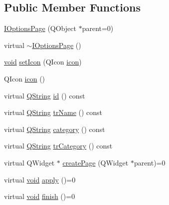 \subsection*{Public Member Functions}
\begin{DoxyCompactItemize}
\item 
\hyperlink{group___core_plugin_ga9b695b2de67229131dbe91bd1ef22ef8}{I\-Options\-Page} (Q\-Object $\ast$parent=0)
\item 
virtual \hyperlink{group___core_plugin_gaaea80acd4f4df67edf6a8027abf6b016}{$\sim$\-I\-Options\-Page} ()
\item 
\hyperlink{group___u_a_v_objects_plugin_ga444cf2ff3f0ecbe028adce838d373f5c}{void} \hyperlink{group___core_plugin_gaab16eddf8ad1ee26863b41acaf18feb3}{set\-Icon} (Q\-Icon \hyperlink{group___core_plugin_gac858e7a1ee4af77f311dba0b44d22d4d}{icon})
\item 
Q\-Icon \hyperlink{group___core_plugin_gac858e7a1ee4af77f311dba0b44d22d4d}{icon} ()
\item 
virtual \hyperlink{group___u_a_v_objects_plugin_gab9d252f49c333c94a72f97ce3105a32d}{Q\-String} \hyperlink{group___core_plugin_ga2984fb6ab0e3b502783dfee7ba596268}{id} () const 
\item 
virtual \hyperlink{group___u_a_v_objects_plugin_gab9d252f49c333c94a72f97ce3105a32d}{Q\-String} \hyperlink{group___core_plugin_ga9bda94026b37720a30f4294560c79244}{tr\-Name} () const 
\item 
virtual \hyperlink{group___u_a_v_objects_plugin_gab9d252f49c333c94a72f97ce3105a32d}{Q\-String} \hyperlink{group___core_plugin_ga03767437394cdfbfc9e253638a71b132}{category} () const 
\item 
virtual \hyperlink{group___u_a_v_objects_plugin_gab9d252f49c333c94a72f97ce3105a32d}{Q\-String} \hyperlink{group___core_plugin_gac5538fc040c826784167edb4fc359b68}{tr\-Category} () const 
\item 
virtual Q\-Widget $\ast$ \hyperlink{group___core_plugin_gac70a4473b3e086d0fa9849c431fb0672}{create\-Page} (Q\-Widget $\ast$parent)=0
\item 
virtual \hyperlink{group___u_a_v_objects_plugin_ga444cf2ff3f0ecbe028adce838d373f5c}{void} \hyperlink{group___core_plugin_ga05fa0c9b91da02a0f2fed11d2d6afed0}{apply} ()=0
\item 
virtual \hyperlink{group___u_a_v_objects_plugin_ga444cf2ff3f0ecbe028adce838d373f5c}{void} \hyperlink{group___core_plugin_ga47cf2602b6ee72a4971b1f0a4e1d887e}{finish} ()=0
\end{DoxyCompactItemize}


